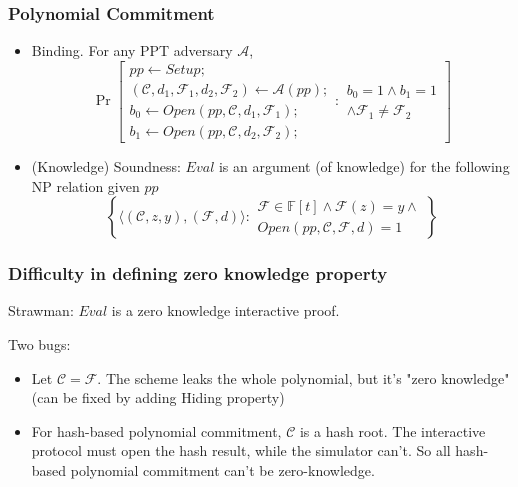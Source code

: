 \documentclass[UFT8]{beamer}
\begin{document}
\begin{frame}
	\frametitle{Polynomial Commitment}

	\begin{definition}
	\begin{itemize}
		\item Binding. For any PPT adversary $\mathcal{A}$,
		\begin{equation*}
			\Pr\left[
				\begin{aligned}
					pp \leftarrow Setup;  \\
					(\mathcal{C}, d_1, \mathcal{F}_1, d_2, \mathcal{F}_2) \leftarrow \mathcal{A}(pp); \\
					b_0 \leftarrow Open(pp, \mathcal{C}, d_1, \mathcal{F}_1); \\
					b_1 \leftarrow Open(pp, \mathcal{C}, d_2, \mathcal{F}_2);
				\end{aligned} : \begin{aligned}
					b_0 = 1 \land b_1 = 1 \\
					\land \mathcal{F}_1 \neq \mathcal{F}_2
				\end{aligned}
			\right]
		\end{equation*}
		\item (Knowledge) Soundness: $Eval$ is an argument (of knowledge) for the following NP relation given $pp$
		\begin{equation*}
			\left\{\langle 
				(\mathcal{C}, z, y), (\mathcal{F}, d) 
			\rangle: \begin{aligned}
				\mathcal{F} \in \mathbb{F}[t] \land \mathcal{F}(z) = y \land \\
				Open(pp, \mathcal{C}, \mathcal{F}, d) = 1
			\end{aligned}
			\right\}
		\end{equation*}
	\end{itemize}
	\end{definition}
\end{frame}

\begin{frame}
	\frametitle{Difficulty in defining zero knowledge property}
	Strawman: $Eval$ is a zero knowledge interactive proof.

	Two bugs:
	\begin{itemize}
		\item Let $\mathcal{C} = \mathcal{F}$. The scheme leaks the whole polynomial, but it's "zero knowledge" (can be fixed by adding Hiding property) 
		\item For hash-based polynomial commitment, $\mathcal{C}$ is a hash root.
		The interactive protocol must open the hash result, while the simulator can't.
		So all hash-based polynomial commitment can't be zero-knowledge.
	\end{itemize}
\end{frame}
\end{document}
